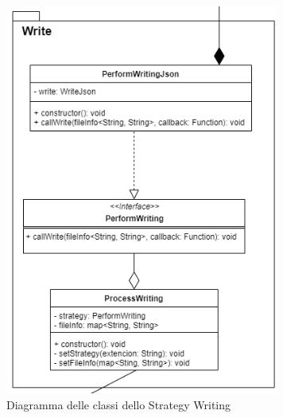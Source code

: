 				\begin{figure} [H]
					\begin{center}
					\includegraphics[width=90mm]{./img/Diagrammi/dAppW.png}
				\end{center}
					\caption{Diagramma delle classi dello Strategy Writing}
				\end{figure}
			
